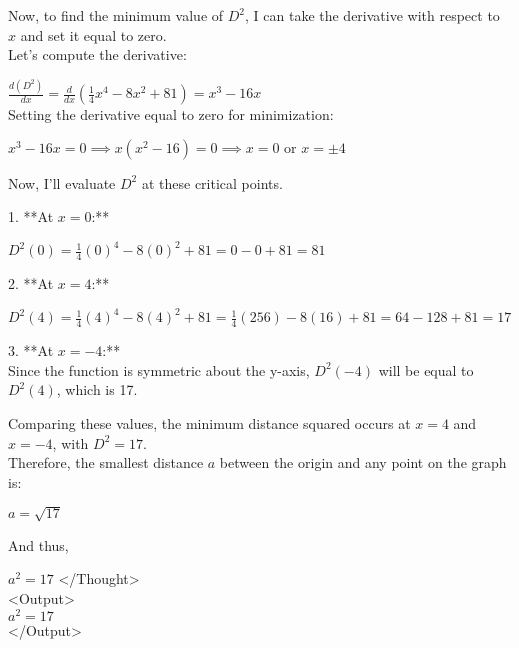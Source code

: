 \begin{abox}
Now, to find the minimum value of $ D^2 $, I can take the derivative with respect to $ x $ and set it equal to zero.\\

Let's compute the derivative:

$
\frac{d(D^2)}{dx} = \frac{d}{dx}\left(\frac{1}{4}x^4 - 8x^2 + 81\right) = x^3 - 16x
$\\

Setting the derivative equal to zero for minimization:

$
x^3 - 16x = 0 \implies x(x^2 - 16) = 0 \implies x = 0 \text{ or } x = \pm4
$\\

\end{abox}
\begin{abox}

Now, I'll evaluate $ D^2 $ at these critical points.

1. **At $ x = 0 $:**

$
D^2(0) = \frac{1}{4}(0)^4 - 8(0)^2 + 81 = 0 - 0 + 81 = 81
$

2. **At $ x = 4 $:**

$
D^2(4) = \frac{1}{4}(4)^4 - 8(4)^2 + 81 = \frac{1}{4}(256) - 8(16) + 81 = 64 - 128 + 81 = 17
$

3. **At $ x = -4 $:**\\

Since the function is symmetric about the y-axis, $ D^2(-4) $ will be equal to $ D^2(4) $, which is 17.

Comparing these values, the minimum distance squared occurs at $ x = 4 $ and $ x = -4 $, with $ D^2 = 17 $.\\

Therefore, the smallest distance $ a $ between the origin and any point on the graph is:

$
a = \sqrt{17}
$

And thus,

$
a^2 = 17
$
</Thought>\\
<Output>\\
$ a^2 = 17 $\\
</Output>
\end{abox}

